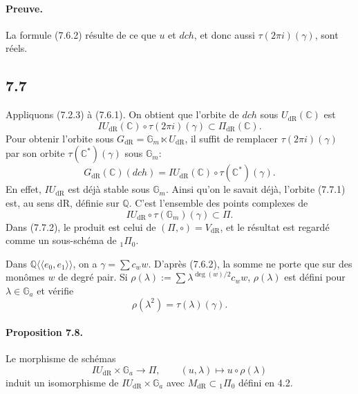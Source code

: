 \documentclass[10pt]{article}
\newcommand{\Q}{\mathbb Q}
\newcommand{\C}{\mathbb C}
\newcommand{\Gm}{\mathbb G_m}
\newcommand{\Ga}{\mathbb G_a}
\newcommand{\dR}{\mathrm{dR}}
\begin{document}
\paragraph{Preuve.}
La formule (7.6.2) résulte de ce que $u$ et $dch$, et donc aussi $\tau(2\pi i)(\gamma)$, sont réels.

\subsection*{7.7}
Appliquons (7.2.3) à (7.6.1). On obtient que l'orbite de $dch$ sous $U_{\dR}(\C)$ est
\[
IU_{\dR}(\C)\circ\tau(2\pi i)(\gamma)\subset\Pi_{\dR}(\C).
\]
Pour obtenir l'orbite sous $G_{\dR}=\Gm\ltimes U_{\dR}$, il suffit de remplacer $\tau(2\pi i)(\gamma)$ par son orbite $\tau(\C^*)(\gamma)$ sous $\Gm$:
\begin{equation}
G_{\dR}(\C)(dch)=IU_{\dR}(\C)\circ\tau(\C^*)(\gamma).
\tag{7.7.1}
\end{equation}
En effet, $IU_{\dR}$ est déjà stable sous $\Gm$. Ainsi qu'on le savait déjà, l'orbite (7.7.1) est, au sens dR, définie sur $\Q$. C'est l'ensemble des points complexes de
\begin{equation}
IU_{\dR}\circ\tau(\Gm)(\gamma)\subset\Pi.
\tag{7.7.2}
\end{equation}
Dans (7.7.2), le produit est celui de $(\Pi,\circ)=V_{\dR}$, et le résultat est regardé comme un sous-schéma de ${}_1\Pi_0$.

Dans $\Q\langle\!\langle e_0,e_1\rangle\!\rangle$, on a $\gamma=\sum c_w w$. D'après (7.6.2), la somme ne porte que sur des monômes $w$ de degré pair. Si $\rho(\lambda):=\sum \lambda^{\deg(w)/2}c_w w$, $\rho(\lambda)$ est défini pour $\lambda\in\Ga$ et vérifie
\begin{equation}
\rho(\lambda^2)=\tau(\lambda)(\gamma).
\tag{7.7.3}
\end{equation}

\paragraph{Proposition 7.8.}
Le morphisme de schémas
\begin{equation}
IU_{\dR}\times\Ga\longrightarrow\Pi,
\qquad (u,\lambda)\longmapsto u\circ\rho(\lambda)
\tag{7.8.1}
\end{equation}
induit un isomorphisme de $IU_{\dR}\times\Ga$ avec $M_{\dR}\subset{}_1\Pi_0$ défini en 4.2.
\end{document}
